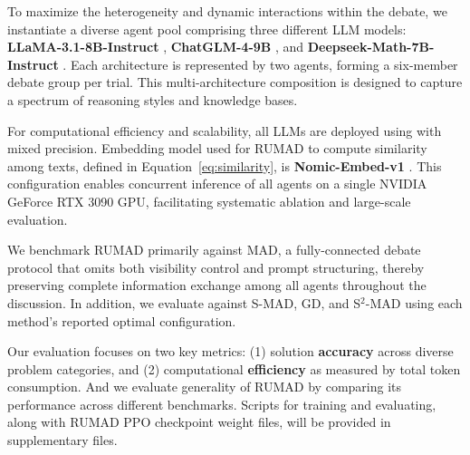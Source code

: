 To maximize the heterogeneity and dynamic interactions within the debate, we instantiate a diverse agent pool comprising three different LLM models: \textbf{LLaMA-3.1-8B-Instruct} \citep{touvron2023llama}, \textbf{ChatGLM-4-9B} \citep{glm2024chatglm}, and \textbf{Deepseek-Math-7B-Instruct} \citep{guo2025deepseek}. Each architecture is represented by two agents, forming a six-member debate group per trial.  This multi-architecture composition is designed to capture a spectrum of reasoning styles and knowledge bases. 

For computational efficiency and scalability, all LLMs are deployed using  with mixed precision. Embedding model used for RUMAD to compute similarity among texts, defined in Equation~\ref{eq:similarity}, is \textbf{Nomic-Embed-v1} \citep{nussbaumNomicEmbedTraining2025}. This configuration enables concurrent inference of all agents on a single NVIDIA GeForce RTX 3090 GPU, facilitating systematic ablation and large-scale evaluation.  

We benchmark RUMAD primarily against MAD, a fully-connected debate protocol that omits both visibility control and prompt structuring, thereby preserving complete information exchange among all agents throughout the discussion. In addition, we evaluate against S-MAD, GD, and S$^2$-MAD using each method’s reported optimal configuration. 

Our evaluation focuses on two key metrics: (1) solution \textbf{accuracy} across diverse problem categories, and (2) computational \textbf{efficiency} as measured by total token consumption. And we evaluate generality of RUMAD by comparing its performance across different benchmarks. Scripts for training and evaluating, along with RUMAD PPO checkpoint weight files, will be provided in supplementary files.

